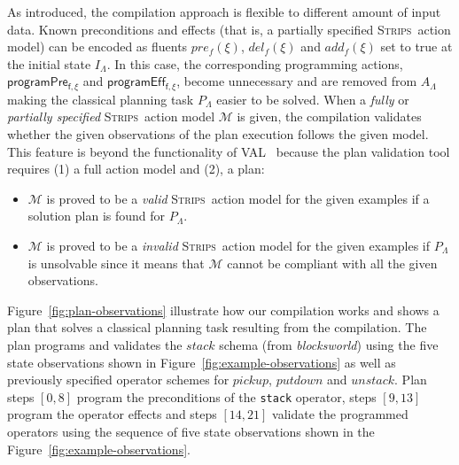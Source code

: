 \documentclass[3p,times]{elsarticle}
\newcommand{\strips}{\textsc{Strips}}     %
\begin{document}
As introduced, the compilation approach is flexible to different amount of input data. Known preconditions and effects (that is, a partially specified \strips\ action model) can be encoded as fluents $pre_f(\xi)$, $del_f(\xi)$ and $add_f(\xi)$ set to true at the initial state $I_{\Lambda}$. In this case, the corresponding programming actions, $\mathsf{programPre_{f,\xi}}$ and $\mathsf{programEff_{f,\xi}}$, become unnecessary and are removed from $A_{\Lambda}$ making the classical planning task $P_{\Lambda}$ easier to be solved. When a {\em fully} or {\em partially specified} \strips\ action model $\mathcal{M}$ is given, the compilation validates whether the given observations of the plan execution follows the given model. This feature is beyond the functionality of VAL~\cite{howey2004val} because the plan validation tool requires (1) a full action model and (2), a plan:
\begin{itemize}
\item $\mathcal{M}$ is proved to be a {\em valid} \strips\ action model for the given examples if a solution plan is found for $P_{\Lambda}$.
\item $\mathcal{M}$ is proved to be a {\em invalid} \strips\ action model for the given examples if $P_{\Lambda}$ is unsolvable since it means that $\mathcal{M}$ cannot be compliant with all the given observations. 
\end{itemize}
  
Figure~\ref{fig:plan-observations} illustrate how our compilation works and shows a plan that solves a classical planning task resulting from the compilation. The plan programs and validates the $stack$ schema (from {\em blocksworld}) using the five state observations shown in Figure~\ref{fig:example-observations} as well as previously specified operator schemes for $pickup$, $putdown$ and $unstack$. Plan steps $[0,8]$ program the preconditions of the {\tt\small stack} operator, steps $[9,13]$ program the operator effects and steps $[14,21]$ validate the programmed operators using the sequence of five state observations shown in the Figure~\ref{fig:example-observations}.
\end{document}
